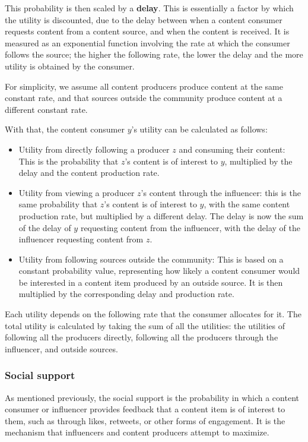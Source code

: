 \documentclass[11pt, letterpaper]{article}
\begin{document}
This probability is then scaled by a \textbf{delay}. This is essentially a factor by which the utility is discounted, due to the delay between when a content consumer requests content from a content source, and when the content is received. It is measured as an exponential function involving the rate at which the consumer follows the source; the higher the following rate, the lower the delay and the more utility is obtained by the consumer.

For simplicity, we assume all content producers produce content at the same constant rate, and that sources outside the community produce content at a different constant rate.

With that, the content consumer \(y\)'s utility can be calculated as follows:
\begin{itemize}
    \item Utility from directly following a producer \(z\) and consuming their content: This is the probability that \(z\)'s content is of interest to \(y\), multiplied by the delay and the content production rate.
    \item Utility from viewing a producer \(z\)'s content through the influencer: this is the same probability that \(z\)'s content is of interest to \(y\), with the same content production rate, but multiplied by a different delay. The delay is now the sum of the delay of \(y\) requesting content from the influencer, with the delay of the influencer requesting content from \(z\).
    \item Utility from following sources outside the community: This is based on a constant probability value, representing how likely a content consumer would be interested in a content item produced by an outside source. It is then multiplied by the corresponding delay and production rate.
\end{itemize}
Each utility depends on the following rate that the consumer allocates for it. The total utility is calculated by taking the sum of all the utilities: the utilities of following all the producers directly, following all the producers through the influencer, and outside sources.

\subsubsection{Social support}

As mentioned previously, the social support is the probability in which a content consumer or influencer provides feedback that a content item is of interest to them, such as through likes, retweets, or other forms of engagement. It is the mechanism that influencers and content producers attempt to maximize.
\end{document}
